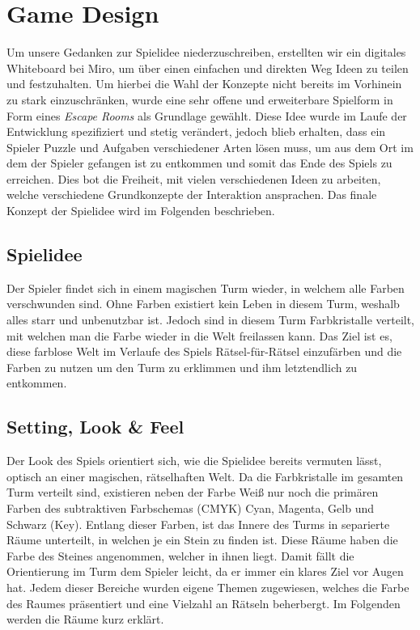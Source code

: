 \chapter{Game Design}
Um unsere Gedanken zur Spielidee niederzuschreiben, erstellten wir ein digitales Whiteboard bei Miro, um über einen einfachen und direkten Weg Ideen zu teilen und festzuhalten. Um hierbei die Wahl der Konzepte nicht bereits im Vorhinein zu stark einzuschränken, wurde eine sehr offene und erweiterbare Spielform in Form eines \textit{Escape Rooms} als Grundlage gewählt. Diese Idee wurde im Laufe der Entwicklung spezifiziert und stetig verändert, jedoch blieb erhalten, dass ein Spieler Puzzle und Aufgaben verschiedener Arten lösen muss, um aus dem Ort im dem der Spieler gefangen ist zu entkommen und somit das Ende des Spiels zu erreichen. Dies bot die Freiheit, mit vielen verschiedenen Ideen zu arbeiten, welche verschiedene Grundkonzepte der Interaktion ansprachen. Das finale Konzept der Spielidee wird im Folgenden beschrieben.

\section{Spielidee}
Der Spieler findet sich in einem magischen Turm wieder, in welchem alle Farben verschwunden sind. Ohne Farben existiert kein Leben in diesem Turm, weshalb alles starr und unbenutzbar ist. Jedoch sind in diesem Turm Farbkristalle verteilt, mit welchen man die Farbe wieder in die Welt freilassen kann. Das Ziel ist es, diese farblose Welt im Verlaufe des Spiels Rätsel-für-Rätsel einzufärben und die Farben zu nutzen um den Turm zu erklimmen und ihm letztendlich zu entkommen.

\section{Setting, Look \& Feel}
Der Look des Spiels orientiert sich, wie die Spielidee bereits vermuten lässt, optisch an einer magischen, rätselhaften Welt. Da die Farbkristalle im gesamten Turm verteilt sind, existieren neben der Farbe Weiß nur noch die primären Farben des subtraktiven Farbschemas (CMYK) Cyan, Magenta, Gelb und Schwarz (Key). Entlang dieser Farben, ist das Innere des Turms in separierte Räume unterteilt, in welchen je ein Stein zu finden ist. Diese Räume haben die Farbe des Steines angenommen, welcher in ihnen liegt. Damit fällt die Orientierung im Turm dem Spieler leicht, da er immer ein klares Ziel vor Augen hat. Jedem dieser Bereiche wurden eigene Themen zugewiesen, welches die Farbe des Raumes präsentiert und eine Vielzahl an Rätseln beherbergt. Im Folgenden werden die Räume kurz erklärt.
\newpage
\noindent
